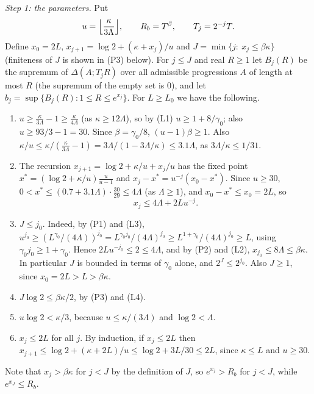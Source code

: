 \medskip\noindent\emph{Step 1: the parameters.} Put
\[
u=\Bigl\lfloor\frac\kappa{3\Lambda}\Bigr\rfloor,\qquad R_b=T^\beta,\qquad T_j=2^{-j}T .
\]
Define $x_0=2L$, $x_{j+1}=\log2+(\kappa+x_j)/u$ and $J=\min\{j:\ x_j\le\beta\kappa\}$ (finiteness of $J$ is shown in (P3) below). For $j\le J$ and real $R\ge1$ let $B_j(R)$ be the supremum of $\Delta(A;T_jR)$ over all admissible progressions $A$ of length at most $R$ (the supremum of the empty set is $0$), and let $b_j=\sup\{B_j(R):1\le R\le e^{x_j}\}$. For $L\ge L_0$ we have the following.
\begin{enumerate}[label=(P\arabic*),leftmargin=*]
\item $u\ge\frac\kappa{3\Lambda}-1\ge\frac\kappa{4\Lambda}$ (as $\kappa\ge12\Lambda$), so by (L1) $u\ge1+8/\gamma_0$; also $u\ge93/3-1=30$. Since $\beta=\gamma_0/8$, $(u-1)\beta\ge1$. Also $\kappa/u\le\kappa/(\frac\kappa{3\Lambda}-1)=3\Lambda/(1-3\Lambda/\kappa)\le3.1\Lambda$, as $3\Lambda/\kappa\le1/31$.
\item The recursion $x_{j+1}=\log2+\kappa/u+x_j/u$ has the fixed point $x^*=(\log2+\kappa/u)\frac u{u-1}$ and $x_j-x^*=u^{-j}(x_0-x^*)$. Since $u\ge30$, $0<x^*\le(0.7+3.1\Lambda)\cdot\frac{30}{29}\le4\Lambda$ (as $\Lambda\ge1$), and $x_0-x^*\le x_0=2L$, so
\[
x_j\le4\Lambda+2Lu^{-j}.
\]
\item $J\le j_0$. Indeed, by (P1) and (L3), $u^{j_0}\ge(L^{\gamma_0}/(4\Lambda))^{j_0}=L^{\gamma_0j_0}/(4\Lambda)^{j_0}\ge L^{1+\gamma_0}/(4\Lambda)^{j_0}\ge L$, using $\gamma_0j_0\ge1+\gamma_0$. Hence $2Lu^{-j_0}\le2\le4\Lambda$, and by (P2) and (L2), $x_{j_0}\le8\Lambda\le\beta\kappa$. In particular $J$ is bounded in terms of $\gamma_0$ alone, and $2^J\le2^{j_0}$. Also $J\ge1$, since $x_0=2L>L>\beta\kappa$.
\item $J\log2\le\beta\kappa/2$, by (P3) and (L4).
\item $u\log2<\kappa/3$, because $u\le\kappa/(3\Lambda)$ and $\log2<\Lambda$.
\item $x_j\le2L$ for all $j$. By induction, if $x_j\le2L$ then $x_{j+1}\le\log2+(\kappa+2L)/u\le\log2+3L/30\le2L$, since $\kappa\le L$ and $u\ge30$.
\end{enumerate}
Note that $x_j>\beta\kappa$ for $j<J$ by the definition of $J$, so $e^{x_j}>R_b$ for $j<J$, while $e^{x_J}\le R_b$.

